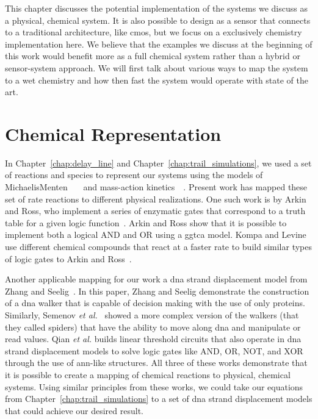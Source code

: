 This chapter discusses the potential implementation of the systems we discuss as a physical, chemical system. It is also possible to design as a sensor that connects to a traditional architecture, like \gls{cmos}, but we focus on a exclusively chemistry implementation here. We believe that the examples we discuss at the beginning of this work would benefit more as a full chemical system rather than a hybrid or sensor-system approach. We will first talk about various ways to map the system to a wet chemistry and how then fast the system would operate with state of the art.

\section{Chemical Representation}
In Chapter~\ref{chap:delay_line} and Chapter~\ref{chap:trail_simulations}, we used a set of reactions and species to represent our systems using the models of Michaelis\hyph Menten~\cite{Henri1903-jf}~\cite{Michaelis1913-zv}~\cite{Leskovac2003-ei} and mass-action kinetics~\cite{Horn1972-ob}~\cite{Erdi1989-ll}. Present work has mapped these set of rate reactions to different physical realizations. One such work is by Arkin and Ross, who implement a series of enzymatic gates that correspond to a truth table for a given logic function~\cite{Arkin1994-bs}. Arkin and Ross show that it is possible to implement both a logical AND and OR using a \gls{ggtca} model. Kompa and Levine use different chemical compounds that react at a faster rate to build similar types of logic gates to Arkin and Ross~\cite{Kompa2001-yk}.

Another applicable mapping for our work a \gls{dna} strand displacement model from Zhang and Seelig~\cite{Zhang2011-ey}. In this paper, Zhang and Seelig demonstrate the construction of a \gls{dna} walker that is capable of decision making with the use of only proteins. Similarly, Semenov \textit{et al.}~\cite{Semenov2014-bv} showed a more complex version of the walkers (that they called spiders) that have the ability to move along \gls{dna} and manipulate or read values. Qian \textit{et al.} builds linear threshold circuits that also operate in \gls{dna} strand displacement models to solve logic gates like AND, OR, NOT, and XOR through the use of \gls{ann}-like structures. All three of these works demonstrate that it is possible to create a mapping of chemical reactions to physical, chemical systems. Using similar principles from these works, we could take our equations from Chapter~\ref{chap:trail_simulations} to a set of \gls{dna} strand displacement models that could achieve our desired result.

